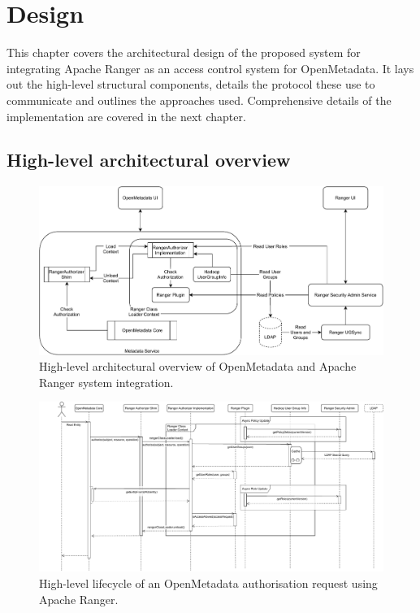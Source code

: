 \chapter{\label{cha:design} Design}

This chapter covers the architectural design of the proposed system for integrating Apache Ranger as an access control system for OpenMetadata. It lays out the high-level structural components, details the protocol these use to communicate and outlines the approaches used. Comprehensive details of the implementation are covered in the next chapter.

\section{High-level architectural overview}

\begin{figure}
    \centering
    \includegraphics[width=\textwidth]{chapters/design/figures/openmetadata-ranger-arch.pdf}
    \caption{High-level architectural overview of OpenMetadata and Apache Ranger system integration.}
    \label{fig:openmetadata-ranger-arch}
\end{figure}

\begin{figure}
    \centering
    \includegraphics[width=\textwidth]{chapters/design/figures/openmetadata-ranger-lifecycle.pdf}
    \caption{High-level lifecycle of an  OpenMetadata authorisation request using Apache Ranger.}
    \label{fig:openmetadata-ranger-lifecycle}
\end{figure}

